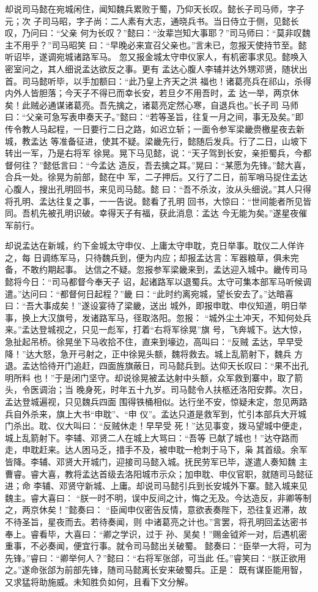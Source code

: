 却说司马懿在宛城闲住，闻知魏兵累败于蜀，乃仰天长叹。懿长子司马师，字子元；次
子司马昭，字子尚：二人素有大志，通晓兵书。当日侍立于侧，见懿长叹，乃问曰：“父亲
何为长叹？”懿曰：“汝辈岂知大事耶？”司马师曰：“莫非叹魏主不用乎？”司马昭笑
曰：“早晚必来宣召父亲也。”言未已，忽报天使持节至。懿听诏毕，遂调宛城诸路军马。
忽又报金城太守申仪家人，有机密事求见。懿唤入密室问之，其人细说孟达欲反之事。更有
孟达心腹人李辅并达外甥邓贤，随状出首。司马懿听毕，以手加额曰：“此乃皇上齐天之洪
福也！诸葛亮兵在祁山，杀得内外人皆胆落；今天子不得已而幸长安，若旦夕不用吾时，孟
达一举，两京休矣！此贼必通谋诸葛亮。吾先擒之，诸葛亮定然心寒，自退兵也。”长子司
马师曰：“父亲可急写表申奏天子。”懿曰：“若等圣旨，往复一月之间，事无及矣。”即
传令教人马起程，一日要行二日之路，如迟立斩；一面令参军梁畿赍檄星夜去新城，教孟达
等准备征进，使其不疑。梁畿先行，懿随后发兵。行了二日，山坡下转出一军，乃是右将军
徐晃。晃下马见懿，说：“天子驾到长安，亲拒蜀兵，今都督何往？”懿低言曰：“今孟达
造反，吾去擒之耳。”晃曰：“某愿为先锋。”懿大喜，合兵一处。徐晃为前部，懿在中
军，二子押后。又行了二日，前军哨马捉住孟达心腹人，搜出孔明回书，来见司马懿。懿
曰：“吾不杀汝，汝从头细说。”其人只得将孔明、孟达往复之事，一一告说。懿看了孔明
回书，大惊曰：“世间能者所见皆同。吾机先被孔明识破。幸得天子有福，获此消息：孟达
今无能为矣。”遂星夜催军前行。

却说孟达在新城，约下金城太守申仪、上庸太守申耽，克日举事。耽仪二人佯许之，每
日调练军马，只待魏兵到，便为内应；却报孟达言：军器粮草，俱未完备，不敢约期起事。
达信之不疑。忽报参军梁畿来到，孟达迎入城中。畿传司马懿将今日：“司马都督今奉天子
诏，起诸路军以退蜀兵。太守可集本部军马听候调遣。”达问曰：“都督何日起程？”畿
曰：“此时约离宛城，望长安去了。”达暗喜曰：“吾大事成矣！”遂设宴待了梁畿，送出
城外，即报申耽、申仪知道，明日举事，换上大汉旗号，发诸路军马，径取洛阳。忽报：
“城外尘土冲天，不知何处兵来。”孟达登城视之，只见一彪军，打着“右将军徐晃”旗
号，飞奔城下。达大惊，急扯起吊桥。徐晃坐下马收拾不住，直来到壕边，高叫曰：“反贼
孟达，早早受降！”达大怒，急开弓射之，正中徐晃头额，魏将救去。城上乱箭射下，魏兵
方退。孟达恰待开门追赶，四面旌旗蔽日，司马懿兵到。达仰天长叹曰：“果不出孔明所料
也！”于是闭门坚守。却说徐晃被孟达射中头额，众军救到寨中，取了箭头，令医调治；当
晚身死，时年五十九岁。司马懿令人扶柩还洛阳安葬。次日，孟达登城遍视，只见魏兵四面
围得铁桶相似。达行坐不安，惊疑未定，忽见两路兵自外杀来，旗上大书“申耽”、“申
仪”。孟达只道是救军到，忙引本部兵大开城门杀出。耽、仪大叫曰：“反贼休走！早早受
死！”达见事变，拨马望城中便走，城上乱箭射下。李辅、邓贤二人在城上大骂曰：“吾等
已献了城也！”达夺路而走，申耽赶来。达人困马乏，措手不及，被申耽一枪刺于马下，枭
其首级。余军皆降。李辅、邓贤大开城门，迎接司马懿入城。抚民劳军已毕，遂遣人奏知魏
主曹睿。睿大喜，教将孟达首级去洛阳城市示众；加申耽、申仪官职，就随司马懿征进；命
李辅、邓贤守新城、上庸。却说司马懿引兵到长安城外下寨。懿入城来见魏主。睿大喜曰：
“朕一时不明，误中反间之计，悔之无及。今达造反，非卿等制之，两京休矣！”懿奏曰：
“臣闻申仪密告反情，意欲表奏陛下，恐往复迟滞，故不待圣旨，星夜而去。若待奏闻，则
中诸葛亮之计也。”言罢，将孔明回孟达密书奉上。睿看毕，大喜曰：“卿之学识，过于
孙、吴矣！”赐金钺斧一对，后遇机密重事，不必奏闻，便宜行事。就令司马懿出关破蜀。
懿奏曰：“臣举一大将，可为先锋。”睿曰：“卿举何人？”懿曰：“右将军张郃，可当此
任。”睿笑曰：“朕正欲用之。”遂命张郃为前部先锋，随司马懿离长安来破蜀兵。正是：
既有谋臣能用智，又求猛将助施威。未知胜负如何，且看下文分解。